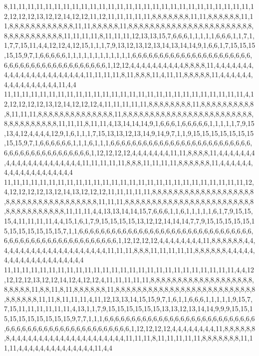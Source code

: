 8,11,11,11,11,11,11,11,11,11,11,11,11,11,11,11,11,11,11,11,11,11,11,11,11,11,11,11,12,12,12,12,13,12,12,14,12,12,11,12,11,11,11,11,11,8,8,8,8,8,8,8,11,11,8,8,8,8,8,8,11,11,8,8,8,8,8,8,8,8,8,8,8,8,11,11,8,8,8,8,8,11,8,8,8,8,8,8,8,8,8,8,8,8,8,8,8,8,8,8,8,8,8,8,8,8,8,8,8,8,8,8,8,8,8,8,11,11,11,11,8,11,11,11,12,13,13,15,7,6,6,6,1,1,1,1,1,6,6,6,1,1,7,1,1,7,7,15,11,4,4,12,12,4,12,15,1,1,1,7,9,13,12,13,12,13,14,13,14,14,9,1,6,6,1,7,15,15,15,15,15,9,7,1,6,6,6,6,6,1,1,1,1,1,1,1,1,1,1,1,1,6,6,6,6,6,6,6,6,6,6,6,6,6,6,6,6,6,6,6,6,6,6,6,6,6,6,6,6,6,6,6,6,6,6,6,6,6,6,6,6,6,1,12,12,4,4,4,4,4,4,4,4,4,4,8,8,8,8,11,4,4,4,4,4,4,4,4,4,4,4,4,4,4,4,4,4,4,4,4,4,4,11,11,11,11,8,11,8,8,8,11,4,11,11,8,8,8,8,8,11,4,4,4,4,4,4,4,4,4,4,4,4,4,4,4,4,11,4,4
11,11,11,11,11,11,11,11,11,11,11,11,11,11,11,11,11,11,11,11,11,11,11,11,11,11,11,4,12,12,12,12,12,13,12,14,12,12,12,4,11,11,11,11,11,8,8,8,8,8,8,8,8,11,8,8,8,8,8,8,8,8,8,8,8,11,11,11,8,8,8,8,8,8,8,8,8,8,8,8,8,8,11,8,8,8,8,8,8,8,8,8,8,8,8,8,8,8,8,8,8,8,8,8,8,8,8,8,8,8,8,8,8,8,8,8,8,11,11,11,8,11,11,4,13,14,14,14,9,1,6,6,6,1,6,6,6,6,6,1,1,1,1,1,7,9,15,13,4,12,4,4,4,4,12,9,1,6,1,1,1,7,15,13,13,12,13,14,9,14,9,7,1,1,9,15,15,15,15,15,15,15,15,15,9,7,1,6,6,6,6,6,6,1,1,1,6,1,1,1,6,6,6,6,6,6,6,6,6,6,6,6,6,6,6,6,6,6,6,6,6,6,6,6,6,6,6,6,6,6,6,6,6,6,6,6,6,6,6,6,6,6,1,12,12,12,12,4,4,4,4,4,4,4,11,11,8,8,8,8,11,4,4,4,4,4,4,4,4,4,4,4,4,4,4,4,4,4,4,4,4,4,11,11,11,11,11,8,8,8,11,11,11,11,8,8,8,8,8,8,11,4,4,4,4,4,4,4,4,4,4,4,4,4,4,4,4,4,4,4
11,11,11,11,11,11,11,11,11,11,11,11,11,11,11,11,11,11,11,11,11,11,11,11,11,11,11,12,4,12,12,12,12,13,12,14,13,12,12,12,11,11,11,11,11,8,8,8,8,8,8,8,8,8,8,8,8,8,8,8,8,8,8,8,8,8,8,8,8,8,8,8,8,8,8,8,8,8,8,8,8,11,11,11,8,8,8,8,8,8,8,8,8,8,8,8,8,8,8,8,8,8,8,8,8,8,8,8,8,8,8,8,8,8,8,8,8,8,8,11,11,11,4,4,13,13,14,14,15,7,6,6,6,1,1,6,1,1,1,1,1,6,1,7,9,15,15,15,4,11,11,11,11,4,4,15,1,6,1,7,9,15,15,15,15,13,12,12,14,14,14,7,7,9,15,15,15,15,15,15,15,15,15,15,15,15,7,1,1,6,6,6,6,6,6,6,6,6,6,6,6,6,6,6,6,6,6,6,6,6,6,6,6,6,6,6,6,6,6,6,6,6,6,6,6,6,6,6,6,6,6,6,6,6,6,6,6,6,6,6,6,6,1,12,12,12,12,4,4,4,4,4,4,4,4,11,8,8,8,8,8,8,4,4,4,4,4,4,4,4,4,4,4,4,4,4,4,4,4,4,4,4,4,11,11,11,8,8,8,11,11,11,11,11,8,8,8,8,8,8,4,4,4,4,4,4,4,4,4,4,4,4,4,4,4,4,4,4,4,4
11,11,11,11,11,11,11,11,11,11,11,11,11,11,11,11,11,11,11,11,11,11,11,11,11,11,4,4,12,12,12,12,13,12,12,14,12,4,12,12,4,11,11,11,11,11,8,8,8,8,8,8,8,8,8,8,8,8,8,8,8,8,8,8,8,8,8,8,8,8,11,8,8,11,8,11,8,8,8,8,8,8,11,8,8,8,8,8,8,8,8,8,8,8,8,8,8,8,8,8,8,8,8,8,8,8,8,8,8,8,8,8,8,8,8,11,11,8,11,11,11,4,11,12,13,13,14,15,15,9,7,1,6,1,1,6,6,6,1,1,1,1,1,9,15,7,7,15,11,11,11,11,11,11,4,13,1,1,7,9,15,15,15,15,15,15,13,13,12,13,14,14,9,9,9,15,15,15,15,15,15,15,15,15,15,9,7,7,1,1,1,6,6,6,6,6,6,6,6,6,6,6,6,6,6,6,6,6,6,6,6,6,6,6,6,6,6,6,6,6,6,6,6,6,6,6,6,6,6,6,6,6,6,6,6,6,6,6,6,6,6,6,1,12,12,12,12,4,4,4,4,4,4,4,4,11,8,8,8,8,8,8,8,4,4,4,4,4,4,4,4,4,4,4,4,4,4,4,4,4,4,4,4,4,11,11,11,8,11,11,11,11,11,8,8,8,8,8,8,8,11,11,11,4,4,4,4,4,4,4,4,4,4,4,4,4,4,11,4,4
